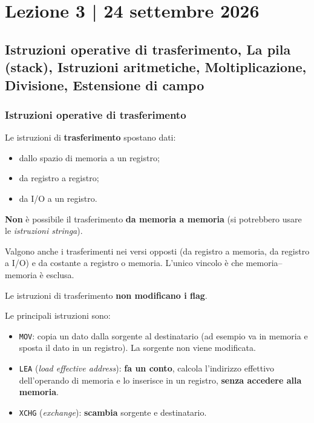 \documentclass[11pt,a4paper]{article}
\begin{document}
	\section*{Lezione 3 | 24 settembre 2026}
	\subsection*{Istruzioni operative di trasferimento, La pila (stack), Istruzioni aritmetiche, Moltiplicazione, Divisione, Estensione di campo}

\subsubsection*{Istruzioni operative di trasferimento}

Le istruzioni di \textbf{trasferimento} spostano dati:
\begin{itemize}[leftmargin=*]
  \item dallo spazio di memoria a un registro;
  \item da registro a registro;
  \item da I/O a un registro.
\end{itemize}
\textbf{Non} è possibile il trasferimento \textbf{da memoria a memoria} (si potrebbero usare le \emph{istruzioni stringa}).

\begin{integrazione}
Valgono anche i trasferimenti nei versi opposti (da registro a memoria, da registro a I/O) e da costante a registro o memoria. L'unico vincolo è che memoria--memoria è esclusa.
\end{integrazione}

\begin{nota}
Le istruzioni di trasferimento \textbf{non modificano i flag}.
\end{nota}

Le principali istruzioni sono:
\begin{itemize}[leftmargin=*]
  \item \texttt{MOV}: copia un dato dalla sorgente al destinatario (ad esempio va in memoria e sposta il dato in un registro). La sorgente non viene modificata.
  \item \texttt{LEA} (\emph{load effective address}): \textbf{fa un conto}, calcola l'indirizzo effettivo dell'operando di memoria e lo inserisce in un registro, \textbf{senza accedere alla memoria}.
  \item \texttt{XCHG} (\emph{exchange}): \textbf{scambia} sorgente e destinatario.
\end{itemize}
\end{document}
